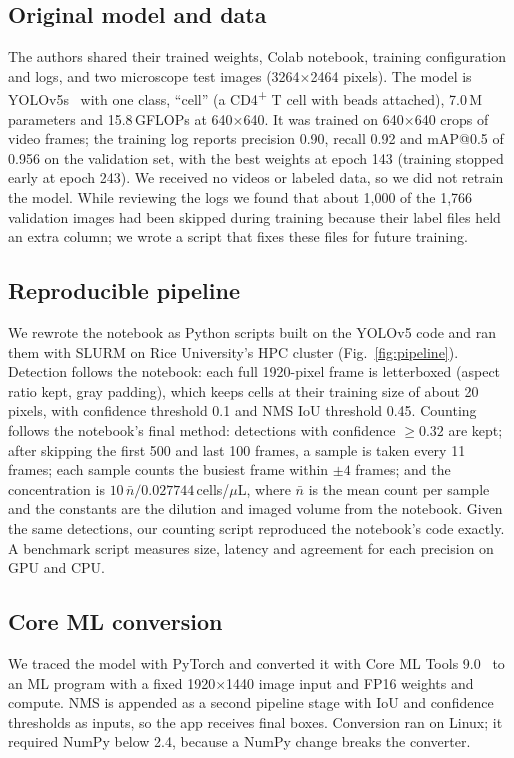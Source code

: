 \documentclass[conference]{IEEEtran}
\newcommand{\cdfour}{CD4\textsuperscript{+}}
\begin{document}
\subsection{Original model and data}
The authors shared their trained weights, Colab notebook, training configuration and logs, and two microscope test images (3264$\times$2464 pixels). The model is YOLOv5s~\cite{yolov5} with one class, ``cell'' (a \cdfour{} T cell with beads attached), 7.0\,M parameters and 15.8\,GFLOPs at 640$\times$640. It was trained on 640$\times$640 crops of video frames; the training log reports precision 0.90, recall 0.92 and mAP@0.5 of 0.956 on the validation set, with the best weights at epoch 143 (training stopped early at epoch 243). We received no videos or labeled data, so we did not retrain the model. While reviewing the logs we found that about 1,000 of the 1,766 validation images had been skipped during training because their label files held an extra column; we wrote a script that fixes these files for future training.

\subsection{Reproducible pipeline}
We rewrote the notebook as Python scripts built on the YOLOv5 code and ran them with SLURM on Rice University's HPC cluster (Fig.~\ref{fig:pipeline}). Detection follows the notebook: each full 1920-pixel frame is letterboxed (aspect ratio kept, gray padding), which keeps cells at their training size of about 20 pixels, with confidence threshold 0.1 and NMS IoU threshold 0.45. Counting follows the notebook's final method: detections with confidence $\geq 0.32$ are kept; after skipping the first 500 and last 100 frames, a sample is taken every 11 frames; each sample counts the busiest frame within $\pm 4$ frames; and the concentration is $10\,\bar{n}/0.027744$\,cells/$\mu$L, where $\bar{n}$ is the mean count per sample and the constants are the dilution and imaged volume from the notebook. Given the same detections, our counting script reproduced the notebook's code exactly. A benchmark script measures size, latency and agreement for each precision on GPU and CPU.

\subsection{Core ML conversion}
We traced the model with PyTorch and converted it with Core ML Tools 9.0~\cite{coremlquant} to an ML program with a fixed 1920$\times$1440 image input and FP16 weights and compute. NMS is appended as a second pipeline stage with IoU and confidence thresholds as inputs, so the app receives final boxes. Conversion ran on Linux; it required NumPy below 2.4, because a NumPy change breaks the converter.
\end{document}
